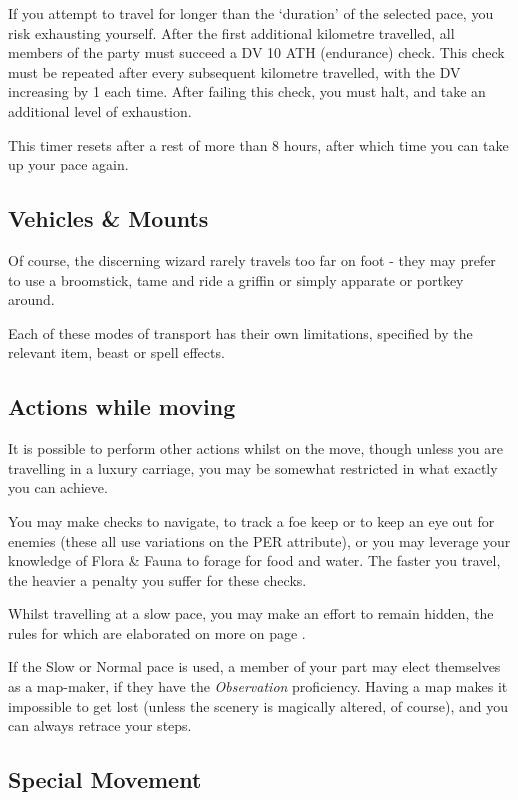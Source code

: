 If you attempt to travel for longer than the `duration' of the selected pace, you risk exhausting yourself. After the first additional kilometre travelled, all members of the party must succeed a DV 10 ATH (endurance) check. This check must be repeated after every subsequent kilometre travelled, with the DV increasing by 1 each time. After failing this check, you must halt, and take an additional level of exhaustion. 

This timer resets after a rest of more than 8 hours, after which time you can take up your pace again. 

\subsection{Vehicles \& Mounts}

Of course, the discerning wizard rarely travels too far on foot - they may prefer to use a broomstick, tame and ride a griffin or simply apparate or portkey around. 

Each of these modes of transport has their own limitations, specified by the relevant item, beast or spell effects. 

\subsection{Actions while moving}

It is possible to perform other actions whilst on the move, though unless you are travelling in a luxury carriage, you may be somewhat restricted in what exactly you can achieve. 

You may make checks to navigate, to track a foe keep or to keep an eye out for enemies (these all use variations on the PER attribute), or you may leverage your knowledge of Flora \& Fauna to forage for food and water. The faster you travel, the heavier a penalty you suffer for these checks. 

Whilst travelling at a slow pace, you may make an effort to remain hidden, the rules for which are elaborated on more on page \pageref{S:Stealth}. 

If the Slow or Normal pace is used, a member of your part may elect themselves as a map-maker, if they have the {\it Observation} proficiency. Having a map makes it impossible to get lost (unless the scenery is magically altered, of course), and you can always retrace your steps. 

\subsection{Special Movement}

